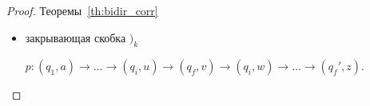 \begin{proof}{Теоремы~\ref{th:bidir_corr}}
\begin{itemize}
      По лемме~\ref{lemma:bidir_equiv}, из наличия дикового пути $w \path v$ следует наличие дикового пути $v \path w$. Вместе два диковых пути $u \path v$ и $v \path w$ образуют один путь $u \path w$. 

      Сожмём этот путь в одну вершину $uw$. Получим более короткий путь, для него по предположению индукции существует аналогичный простой путь. Если этот простой путь не проходит через вершину $uw$, то он и является ответом. Иначе. Если вершина $uw$ находится на 2, 4 или 7 слое, то следующее за ней ребро в простом пути имеет метку $S$, а значит, вместе с диковым путём $u \path w$ собирается в один диков путь (по правилу $S \to SS$, как в случае $(_k$). Если же $uw$ находится на 1 слое, то весь путь от неё до $z$~--- один диков путь, который так же складывается с путём $u \path w$.  




    \item закрывающая скобка $)_k$

      $p \colon (q_1, a) \rightarrow \dots \rightarrow (q_i, u) \rightarrow (q_f, v) \rightarrow (q_i, w) \rightarrow \dots \rightarrow (q_f', z)$.



\end{itemize}
\end{proof}
